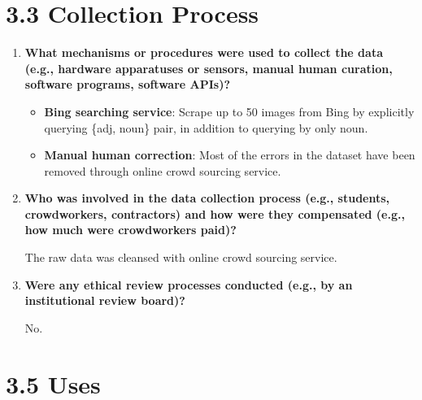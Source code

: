 \documentclass[a4paper,12pt]{article}
\begin{document}
\section*{3.3 Collection Process}

\begin{enumerate}

    \item \textbf{What mechanisms or procedures were used to collect the data
    (e.g., hardware apparatuses or sensors, manual human curation,
    software programs, software APIs)?}

    \begin{itemize}
        \item \textbf{Bing searching service}: Scrape up to 50 images from Bing by explicitly querying \{adj, noun\} pair, in addition to querying by only noun. 
        \item \textbf{Manual human correction}: Most of the errors in the dataset have been removed through online crowd sourcing service.
    \end{itemize}

    \item \textbf{Who was involved in the data collection process (e.g., students,
    crowdworkers, contractors) and how were they compensated (e.g.,
    how much were crowdworkers paid)?}

    The raw data was cleansed with online crowd sourcing service.
  
    \item \textbf{Were any ethical review processes conducted (e.g., by an institutional review board)?}
    
    No.


\end{enumerate}



\section*{3.5 Uses}
\end{document}
